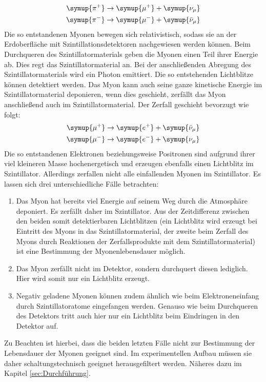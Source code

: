 \begin{align}
  \symup{\pi^+}\to\symup{\mu^+}+\symup{\nu_\mu}\\
  \symup{\pi^-}\to\symup{\mu^-}+\symup{\bar{\nu}_\mu}
\end{align}
Die so entstandenen Myonen bewegen sich relativistisch, sodass sie an der Erdoberfläche mit Szintillationsdetektoren nachgewiesen werden können.
Beim Durchqueren des Szintillatormaterials geben die Myonen einen Teil ihrer Energie ab. Dies regt das Szintillatormaterial an. Bei der anschließenden Abregung des Szintillatormaterials wird ein Photon emittiert.
Die so entstehenden Lichtblitze können detektiert werden.
Das Myon kann auch seine ganze kinetische Energie im Szintillatormaterial deponieren, wenn dies geschieht, zerfällt das Myon anschließend auch im Szintillatormaterial.
Der Zerfall geschieht bevorzugt wie folgt:
\begin{align}
  \symup{\mu^+}\to\symup{e^+}+\symup{\bar{\nu}_\mu} \\
  \symup{\mu^-}\to\symup{e^-}+\symup{\nu_\mu}
\end{align}
Die so entstandenen Elektronen beziehungsweise Positronen sind aufgrund ihrer viel kleineren Masse hochenergetisch und erzeugen ebenfalls einen Lichtblitz im Szintillator.
Allerdings zerfallen nicht alle einfallenden Myonen im Szintillator.
Es lassen sich drei unterschiedliche Fälle betrachten:
\begin{enumerate}
  \item Das Myon hat bereits viel Energie auf seinem Weg durch die Atmosphäre deponiert. Es zerfällt daher im Szintillator. Aus der Zeitdifferenz zwischen den beiden somit detektierbaren Lichtblitzen (ein Lichtblitz wird erzeugt bei Eintritt des Myons in das Szintillatormaterial, der zweite beim Zerfall des Myons durch Reaktionen der Zerfallsprodukte mit dem Szintillatormaterial) ist eine Bestimmung der Myonenlebensdauer möglich.
  \item Das Myon zerfällt nicht im Detektor, sondern durchquert diesen lediglich. Hier wird somit nur ein Lichtblitz erzeugt.
  \item Negativ geladene Myonen können zudem ähnlich wie beim Elektroneneinfang durch Szintillatoratome eingefangen werden. Genauso wie beim Durchqueren des Detektors tritt auch hier nur ein Lichtblitz beim Eindringen in den Detektor auf.
\end{enumerate}

Zu Beachten ist hierbei, dass die beiden letzten Fälle nicht zur Bestimmung der Lebensdauer der Myonen geeignet sind. Im experimentellen Aufbau müssen sie daher schaltungstechnisch geeignet herausgefiltert werden. Näheres dazu im Kapitel \ref{sec:Durchführung}.

